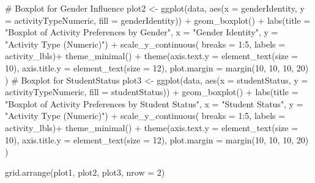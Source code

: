\documentclass[
  letterpaper,
  DIV=11,
  numbers=noendperiod]{scrartcl}
\newenvironment{Shaded}{\begin{snugshade}}{\end{snugshade}}
\newcommand{\AttributeTok}[1]{\textcolor[rgb]{0.40,0.45,0.13}{#1}}
\newcommand{\CommentTok}[1]{\textcolor[rgb]{0.37,0.37,0.37}{#1}}
\newcommand{\DecValTok}[1]{\textcolor[rgb]{0.68,0.00,0.00}{#1}}
\newcommand{\FunctionTok}[1]{\textcolor[rgb]{0.28,0.35,0.67}{#1}}
\newcommand{\NormalTok}[1]{\textcolor[rgb]{0.00,0.23,0.31}{#1}}
\newcommand{\OtherTok}[1]{\textcolor[rgb]{0.00,0.23,0.31}{#1}}
\newcommand{\SpecialCharTok}[1]{\textcolor[rgb]{0.37,0.37,0.37}{#1}}
\newcommand{\StringTok}[1]{\textcolor[rgb]{0.13,0.47,0.30}{#1}}
\begin{document}
\begin{Shaded}
\begin{Highlighting}[]
\CommentTok{\# Boxplot for Gender Influence}
\NormalTok{plot2 }\OtherTok{\textless{}{-}} \FunctionTok{ggplot}\NormalTok{(data, }\FunctionTok{aes}\NormalTok{(}\AttributeTok{x =}\NormalTok{ genderIdentity, }\AttributeTok{y =}\NormalTok{ activityTypeNumeric, }
                          \AttributeTok{fill =}\NormalTok{ genderIdentity)) }\SpecialCharTok{+}
  \FunctionTok{geom\_boxplot}\NormalTok{() }\SpecialCharTok{+}
  \FunctionTok{labs}\NormalTok{(}\AttributeTok{title =} \StringTok{"Boxplot of Activity Preferences by Gender"}\NormalTok{,}
       \AttributeTok{x =} \StringTok{"Gender Identity"}\NormalTok{,}
       \AttributeTok{y =} \StringTok{"Activity Type (Numeric)"}\NormalTok{) }\SpecialCharTok{+}
  \FunctionTok{scale\_y\_continuous}\NormalTok{(}
    \AttributeTok{breaks =} \DecValTok{1}\SpecialCharTok{:}\DecValTok{5}\NormalTok{,}
    \AttributeTok{labels =}\NormalTok{ activity\_lbls)}\SpecialCharTok{+}
  \FunctionTok{theme\_minimal}\NormalTok{() }\SpecialCharTok{+} 
  \FunctionTok{theme}\NormalTok{(}\AttributeTok{axis.text.y =} \FunctionTok{element\_text}\NormalTok{(}\AttributeTok{size =} \DecValTok{10}\NormalTok{),}
    \AttributeTok{axis.title.y =} \FunctionTok{element\_text}\NormalTok{(}\AttributeTok{size =} \DecValTok{12}\NormalTok{), }
    \AttributeTok{plot.margin =} \FunctionTok{margin}\NormalTok{(}\DecValTok{10}\NormalTok{, }\DecValTok{10}\NormalTok{, }\DecValTok{10}\NormalTok{, }\DecValTok{20}\NormalTok{)}
\NormalTok{  )}
\CommentTok{\# Boxplot for StudentStatus}
\NormalTok{plot3 }\OtherTok{\textless{}{-}} \FunctionTok{ggplot}\NormalTok{(data, }\FunctionTok{aes}\NormalTok{(}\AttributeTok{x =}\NormalTok{ studentStatus, }\AttributeTok{y =}\NormalTok{ activityTypeNumeric, }
                          \AttributeTok{fill =}\NormalTok{ studentStatus)) }\SpecialCharTok{+}
  \FunctionTok{geom\_boxplot}\NormalTok{() }\SpecialCharTok{+}
  \FunctionTok{labs}\NormalTok{(}\AttributeTok{title =} \StringTok{"Boxplot of Activity Preferences by Student Status"}\NormalTok{,}
       \AttributeTok{x =} \StringTok{"Student Status"}\NormalTok{,}
       \AttributeTok{y =} \StringTok{"Activity Type (Numeric)"}\NormalTok{) }\SpecialCharTok{+}
  \FunctionTok{scale\_y\_continuous}\NormalTok{(}
    \AttributeTok{breaks =} \DecValTok{1}\SpecialCharTok{:}\DecValTok{5}\NormalTok{,}
    \AttributeTok{labels =}\NormalTok{ activity\_lbls)}\SpecialCharTok{+}
  \FunctionTok{theme\_minimal}\NormalTok{() }\SpecialCharTok{+}
  \FunctionTok{theme}\NormalTok{(}\AttributeTok{axis.text.y =} \FunctionTok{element\_text}\NormalTok{(}\AttributeTok{size =} \DecValTok{10}\NormalTok{),}
    \AttributeTok{axis.title.y =} \FunctionTok{element\_text}\NormalTok{(}\AttributeTok{size =} \DecValTok{12}\NormalTok{), }
    \AttributeTok{plot.margin =} \FunctionTok{margin}\NormalTok{(}\DecValTok{10}\NormalTok{, }\DecValTok{10}\NormalTok{, }\DecValTok{10}\NormalTok{, }\DecValTok{20}\NormalTok{)}
\NormalTok{  )}

\FunctionTok{grid.arrange}\NormalTok{(plot1, plot2, plot3, }\AttributeTok{nrow =} \DecValTok{2}\NormalTok{)}
\end{Highlighting}
\end{Shaded}
\end{document}
